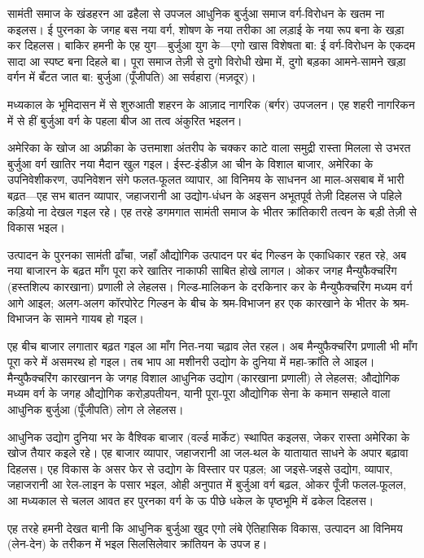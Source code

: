 \documentclass[12pt,a4paper,oneside]{book}
\begin{document}
सामंती समाज के खंडहरन आ ढहैला से उपजल आधुनिक बुर्जुआ समाज वर्ग-विरोधन के खतम ना कइलस। ई पुरनका के जगह बस नया वर्ग, शोषण के नया तरीका आ लड़ाई के नया रूप बना के खड़ा कर दिहलस। बाकिर हमनी के एह युग—बुर्जुआ युग के—एगो खास विशेषता बा: ई वर्ग-विरोधन के एकदम सादा आ स्पष्ट बना दिहले बा। पूरा समाज तेज़ी से दुगो विरोधी खेमा में, दुगो बड़का आमने-सामने खड़ा वर्गन में बँटत जात बा: बुर्जुआ (पूँजीपति) आ सर्वहारा (मज़दूर)।

मध्यकाल के भूमिदासन में से शुरुआती शहरन के आज़ाद नागरिक (बर्गर) उपजलन। एह शहरी नागरिकन में से हीं बुर्जुआ वर्ग के पहला बीज आ तत्व अंकुरित भइलन।

अमेरिका के खोज आ अफ्रीका के उत्तमाशा अंतरीप के चक्कर काटे वाला समुद्री रास्ता मिलला से उभरत बुर्जुआ वर्ग खातिर नया मैदान खुल गइल। ईस्ट-इंडीज़ आ चीन के विशाल बाजार, अमेरिका के उपनिवेशीकरण, उपनिवेशन संगे फलत-फूलत व्यापार, आ विनिमय के साधनन आ माल-असबाब में भारी बढ़त—एह सभ बातन व्यापार, जहाजरानी आ उद्योग-धंधन के अइसन अभूतपूर्व तेज़ी दिहलस जे पहिले कड़ियो ना देखल गइल रहे। एह तरहे डगमगात सामंती समाज के भीतर क्रांतिकारी तत्वन के बड़ी तेज़ी से विकास भइल।

उत्पादन के पुरनका सामंती ढाँचा, जहाँ औद्योगिक उत्पादन पर बंद गिल्डन के एकाधिकार रहत रहे, अब नया बाजारन के बढ़त माँग पूरा करे खातिर नाकाफी साबित होखे लागल। ओकर जगह मैन्युफैक्चरिंग (हस्तशिल्प कारखाना) प्रणाली ले लेहलस। गिल्ड-मालिकन के दरकिनार कर के मैन्युफैक्चरिंग मध्यम वर्ग आगे आइल; अलग-अलग कॉरपोरेट गिल्डन के बीच के श्रम-विभाजन हर एक कारखाने के भीतर के श्रम-विभाजन के सामने गायब हो गइल।

एह बीच बाजार लगातार बढ़त गइल आ माँग नित-नया चढ़ाव लेत रहल। अब मैन्युफैक्चरिंग प्रणाली भी माँग पूरा करे में असमरथ हो गइल। तब भाप आ मशीनरी उद्योग के दुनिया में महा-क्रांति ले आइल। मैन्युफैक्चरिंग कारखानन के जगह विशाल आधुनिक उद्योग (कारखाना प्रणाली) ले लेहलस; औद्योगिक मध्यम वर्ग के जगह औद्योगिक करोड़पतीयन, यानी पूरा-पूरा औद्योगिक सेना के कमान सम्हाले वाला आधुनिक बुर्जुआ (पूँजीपति) लोग ले लेहलस।

आधुनिक उद्योग दुनिया भर के वैश्विक बाजार (वर्ल्ड मार्केट) स्थापित कइलस, जेकर रास्ता अमेरिका के खोज तैयार कइले रहे। एह बाजार व्यापार, जहाजरानी आ जल-थल के यातायात साधने के अपार बढ़ावा दिहलस। एह विकास के असर फेर से उद्योग के विस्तार पर पड़ल; आ जइसे-जइसे उद्योग, व्यापार, जहाजरानी आ रेल-लाइन के पसार भइल, ओही अनुपात में बुर्जुआ वर्ग बढ़ल, ओकर पूँजी फलल-फूलल, आ मध्यकाल से चलल आवत हर पुरनका वर्ग के ऊ पीछे धकेल के पृष्ठभूमि में ढकेल दिहलस।

एह तरहे हमनी देखत बानी कि आधुनिक बुर्जुआ खुद एगो लंबे ऐतिहासिक विकास, उत्पादन आ विनिमय (लेन-देन) के तरीकन में भइल सिलसिलेवार क्रांतियन के उपज ह।
\end{document}

